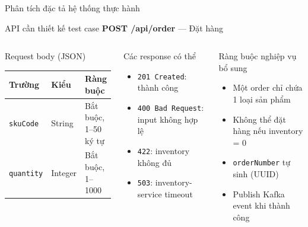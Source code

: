 \documentclass[aspectratio=169,12pt]{beamer}
\begin{document}
\begin{frame}[shrink=12]{Phân tích đặc tả hệ thống thực hành}
  \begin{block}{API cần thiết kế test case}
    \textbf{POST /api/order} --- Đặt hàng
  \end{block}

  \vspace{0.1em}
  \scriptsize
  \begin{columns}[T,totalwidth=\textwidth]
    \begin{block}{Request body (JSON)}
      \setlength{\tabcolsep}{3pt}
      \begin{tabular}{lll}
        \textbf{Trường} & \textbf{Kiểu} & \textbf{Ràng buộc} \\
        \midrule
        \texttt{skuCode} & String & Bắt buộc, 1--50 ký tự \\
        \texttt{quantity} & Integer & Bắt buộc, 1--1000 \\
      \end{tabular}
    \end{block}

    \begin{block}{Các response có thể}
      \begin{itemize}
        \item \texttt{201 Created}: thành công
        \item \texttt{400 Bad Request}: input không hợp lệ
        \item \texttt{422}: inventory không đủ
        \item \texttt{503}: inventory-service timeout
      \end{itemize}
    \end{block}

    \begin{block}{Ràng buộc nghiệp vụ bổ sung}
      \begin{itemize}
        \item Một order chỉ chứa 1 loại sản phẩm
        \item Không thể đặt hàng nếu inventory = 0
        \item \texttt{orderNumber} tự sinh (UUID)
        \item Publish Kafka event khi thành công
      \end{itemize}
    \end{block}
  \end{columns}
\end{frame}
\end{document}
